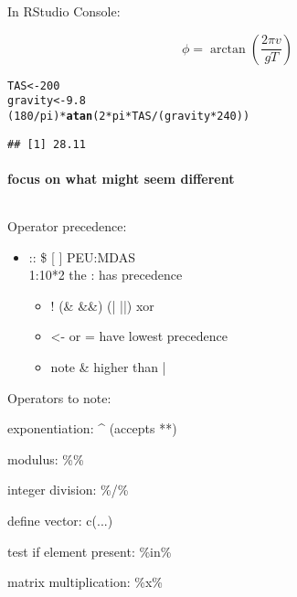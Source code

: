 \documentclass{beamer}\usepackage[]{graphicx}\usepackage[]{color}
\makeatletter
\newcommand{\hlnum}[1]{\textcolor[rgb]{0.686,0.059,0.569}{#1}}%
\newcommand{\hlopt}[1]{\textcolor[rgb]{0,0,0}{#1}}%
\newcommand{\hlstd}[1]{\textcolor[rgb]{0.345,0.345,0.345}{#1}}%
\newcommand{\hlkwb}[1]{\textcolor[rgb]{0.69,0.353,0.396}{#1}}%
\newcommand{\hlkwd}[1]{\textcolor[rgb]{0.737,0.353,0.396}{\textbf{#1}}}%
\newenvironment{kframe}{%
 \def\at@end@of@kframe{}%
 \ifinner\ifhmode%
  \def\at@end@of@kframe{\end{minipage}}%
  \begin{minipage}{\columnwidth}%
 \fi\fi%
 \def\FrameCommand##1{\hskip\@totalleftmargin \hskip-\fboxsep
 \colorbox{shadecolor}{##1}\hskip-\fboxsep
     \hskip-\linewidth \hskip-\@totalleftmargin \hskip\columnwidth}%
 \MakeFramed {\advance\hsize-\width
   \@totalleftmargin\z@ \linewidth\hsize
   \@setminipage}}%
 {\par\unskip\endMakeFramed%
 \at@end@of@kframe}
\newenvironment{knitrout}{}{} %
\makeatother
\begin{document}
\begin{frame}[fragile]{In RStudio Console:}

\begin{exampleblock}{}


\[
\phi=\arctan\left(\frac{2\pi v}{gT}\right)
\]



\begin{knitrout}
\color{fgcolor}\begin{kframe}
\begin{alltt}
\hlstd{TAS} \hlkwb{<-} \hlnum{200}
\hlstd{gravity} \hlkwb{<-} \hlnum{9.8}
\hlstd{(}\hlnum{180} \hlopt{/} \hlstd{pi)} \hlopt{*} \hlkwd{atan} \hlstd{(}\hlnum{2} \hlopt{*} \hlstd{pi} \hlopt{*} \hlstd{TAS} \hlopt{/} \hlstd{(gravity} \hlopt{*} \hlnum{240}\hlstd{))}
\end{alltt}
\begin{verbatim}
## [1] 28.11
\end{verbatim}
\end{kframe}
\end{knitrout}


\framesubtitle{focus on what might seem different}
\begin{columns}


\column{5.5cm}
\begin{block}{Operator precedence:}

\begin{itemize}
\item :: \$ {[} {]} PEU:MDAS\\
1:10{*}2 the : has precedence

\begin{itemize}
\item ! (\& \&\&) (| ||) xor
\item <- or = have lowest precedence
\item note \& higher than |
\end{itemize}
\end{itemize}

\column{5.5cm}
\begin{exampleblock}{Operators to note:}


exponentiation: \textasciicircum{} (accepts {*}{*})


modulus: \%\%


integer division: \%/\%


define vector: c(...)


test if element present: \%in\%


matrix multiplication: \%x\%

\end{exampleblock}
\end{block}
\end{columns}

\end{exampleblock}
\end{frame}
\begin{frame}
\end{frame}
\end{document}
